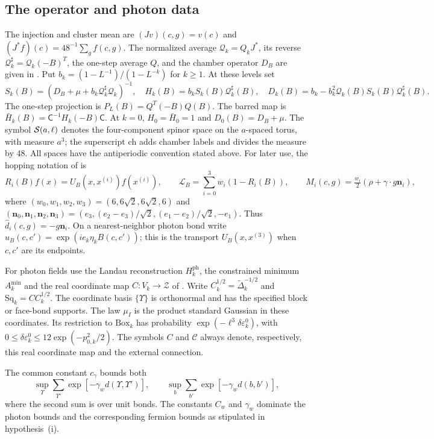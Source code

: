 \subsection{The operator and photon data}

The injection and cluster mean are
$(Jv)(c,g)=v(c)$ and $(J^*f)(c)=48^{-1}\sum_gf(c,g)$.
The normalized average $\mathcal Q_k=Q_kJ^*$, its reverse
$\mathcal Q_k^\sharp=\mathcal Q_k(-B)^T$, the one-step average
$Q$, and the chamber operator $D_B$ are given in
\cite[\S1]{FermionBlockManuscript}. Put $b_k=(1-L^{-1})/(1-L^{-k})$ for $k\ge1$. At these levels set
\[
 S_k(B)=(D_B+\mu+b_k\mathcal Q_k^\sharp\mathcal Q_k)^{-1},\quad
 H_k(B)=b_kS_k(B)\mathcal Q_k^\sharp(B),\quad
 D_k(B)=b_k-b_k^2\mathcal Q_k(B)S_k(B)\mathcal Q_k^\sharp(B).
\]
The one-step projection is $P_L(B)=Q^T(-B)Q(B)$. The barred map is $\bar H_k(B)=\mathsf C^{-1}H_k(-B)\mathsf C$.
At $k=0$, $H_0=\bar H_0=1$ and $D_0(B)=D_B+\mu$.
The symbol $\mathcal S(a,\ell)$ denotes the four-component spinor
space on the $a$-spaced torus, with measure $a^3$; the superscript
$\mathrm{ch}$ adds chamber labels and divides the measure by $48$.
All spaces have the antiperiodic convention stated above.
For later use, the hopping notation of \cite[\S2.1]{FermionBlockManuscript} is
\[
 R_i(B)f(x)=U_B(x,x^{(i)})f(x^{(i)}),\qquad
 \mathcal L_B=\sum_{i=0}^3w_i(1-R_i(B)),\qquad
 M_i(c,g)=\tfrac{w_i}{2}(\rho+\gamma\cdot g\mathbf n_i),
\]
where $(w_0,w_1,w_2,w_3)=(6,6\sqrt2,6\sqrt2,6)$ and
$(\mathbf n_0,\mathbf n_1,\mathbf n_2,\mathbf n_3)=(e_3,(e_2-e_3)/\sqrt2,(e_1-e_2)/\sqrt2,-e_1)$.
Thus $\widehat d_i(c,g)=-g\mathbf n_i$. On a nearest-neighbor photon bond
write $u_B(c,c')=\exp(ie_k\eta_kB(c,c'))$; this is the transport
$U_B(x,x^{(3)})$ when $c,c'$ are its endpoints.

For photon fields use the Landau reconstruction $H_k^{\mathrm{ph}}$,
the constrained minimum $A_k^{\min}$ and the real coordinate map
$C:V_k\to\mathcal Z$ of
\cite[Theorem~A]{MaxwellBlockManuscript}. Write
$C_k^{1/2}=\widetilde\Delta_k^{-1/2}$ and
$\mathrm{Sq}_k=CC_k^{1/2}$. The coordinate basis $\{\Upsilon\}$ is
orthonormal and has the specified block or face-bond supports.
The law $\mu_I$ is the product standard Gaussian in these coordinates.
Its restriction to $\mathrm{Box}_k$ has probability
$\exp(-\ell^3\delta\varepsilon_k^0)$, with
$0\le\delta\varepsilon_k^0\le12\exp(-p_{0,k}^2/2)$.
The symbols $C$ and $\mathscr C$ always denote, respectively,
this real coordinate map and the external connection.

The common constant $c_\gamma$ bounds both
\[
 \sup_\Upsilon\sum_{\Upsilon'}\exp[-\gamma_wd(\Upsilon,\Upsilon')],
 \qquad \sup_b\sum_{b'}\exp[-\gamma_wd(b,b')],
\]
where the second sum is over unit bonds. The constants $C_w$ and
$\gamma_w$ dominate the photon bounds and the corresponding
fermion bounds as stipulated in hypothesis~(i).

